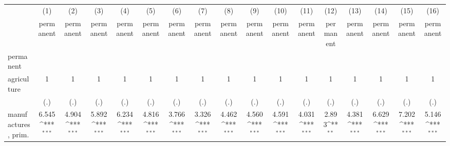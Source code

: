 {
\def\sym#1{\ifmmode^{#1}\else\(^{#1}\)\fi}
\begin{tabular}{l*{16}{c}}
\hline\hline
                    &\multicolumn{1}{c}{(1)}&\multicolumn{1}{c}{(2)}&\multicolumn{1}{c}{(3)}&\multicolumn{1}{c}{(4)}&\multicolumn{1}{c}{(5)}&\multicolumn{1}{c}{(6)}&\multicolumn{1}{c}{(7)}&\multicolumn{1}{c}{(8)}&\multicolumn{1}{c}{(9)}&\multicolumn{1}{c}{(10)}&\multicolumn{1}{c}{(11)}&\multicolumn{1}{c}{(12)}&\multicolumn{1}{c}{(13)}&\multicolumn{1}{c}{(14)}&\multicolumn{1}{c}{(15)}&\multicolumn{1}{c}{(16)}\\
                    &\multicolumn{1}{c}{permanent}&\multicolumn{1}{c}{permanent}&\multicolumn{1}{c}{permanent}&\multicolumn{1}{c}{permanent}&\multicolumn{1}{c}{permanent}&\multicolumn{1}{c}{permanent}&\multicolumn{1}{c}{permanent}&\multicolumn{1}{c}{permanent}&\multicolumn{1}{c}{permanent}&\multicolumn{1}{c}{permanent}&\multicolumn{1}{c}{permanent}&\multicolumn{1}{c}{permanent}&\multicolumn{1}{c}{permanent}&\multicolumn{1}{c}{permanent}&\multicolumn{1}{c}{permanent}&\multicolumn{1}{c}{permanent}\\
\hline
permanent           &                     &                     &                     &                     &                     &                     &                     &                     &                     &                     &                     &                     &                     &                     &                     &                     \\
agriculture         &           1         &           1         &           1         &           1         &           1         &           1         &           1         &           1         &           1         &           1         &           1         &           1         &           1         &           1         &           1         &           1         \\
                    &         (.)         &         (.)         &         (.)         &         (.)         &         (.)         &         (.)         &         (.)         &         (.)         &         (.)         &         (.)         &         (.)         &         (.)         &         (.)         &         (.)         &         (.)         &         (.)         \\
[1em]
manufactures, prim. &       6.545\sym{***}&       4.904\sym{***}&       5.892\sym{***}&       6.234\sym{***}&       4.816\sym{***}&       3.766\sym{***}&       3.326\sym{***}&       4.462\sym{***}&       4.560\sym{***}&       4.591\sym{***}&       4.031\sym{***}&       2.893\sym{**} &       4.381\sym{***}&       6.629\sym{***}&       7.202\sym{***}&       5.146\sym{***}\\

\end{tabular}}
